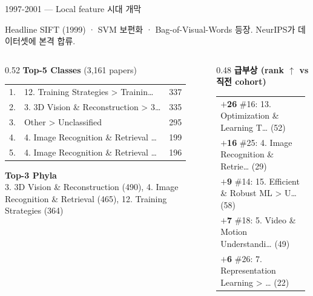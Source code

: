 \documentclass[aspectratio=169,t]{beamer}
\newcommand{\hot}[1]{\textcolor{accentorange}{\textbf{#1}}}
\newcommand{\muted}[1]{\textcolor{mutedgray}{#1}}
\begin{document}
\begin{frame}{1997-2001 \quad — \quad Local feature 시대 개막}
\small
\begin{block}{Headline}
SIFT (1999) · SVM 보편화 · Bag-of-Visual-Words 등장. NeurIPS가 데이터셋에 본격 합류.
\end{block}
\vspace{4pt}

\begin{columns}[T,onlytextwidth]
\begin{column}{0.52\textwidth}
\textbf{Top-5 Classes} \muted{\scriptsize (3,161 papers)}\\[2pt]
\scriptsize
\begin{tabular}{@{}rlr@{}}
    1. & 12. Training Strategies > Trainin… & 337 \\
    2. & 3. 3D Vision \& Reconstruction > 3… & 335 \\
    3. & Other > Unclassified & 295 \\
    4. & 4. Image Recognition \& Retrieval … & 199 \\
    5. & 4. Image Recognition \& Retrieval … & 196 \\
\end{tabular}
\vspace{8pt}

\textbf{\small Top-3 Phyla}\\[2pt]
\scriptsize 3. 3D Vision \& Reconstruction (490), 4. Image Recognition \& Retrieval (465), 12. Training Strategies (364)
\end{column}

\begin{column}{0.48\textwidth}
\textbf{급부상 (rank $\uparrow$ vs 직전 cohort)}\\[2pt]
\scriptsize
\begin{tabular}{@{}p{0.95\linewidth}@{}}
    \hot{$+$26} \#16: 13. Optimization \& Learning T… (52) \\
    \hot{$+$16} \#25: 4. Image Recognition \& Retrie… (29) \\
    \hot{$+$9} \#14: 15. Efficient \& Robust ML > U… (58) \\
    \hot{$+$7} \#18: 5. Video \& Motion Understandi… (49) \\
    \hot{$+$6} \#26: 7. Representation Learning > … (22) \\
\end{tabular}
\end{column}
\end{columns}
\end{frame}
\end{document}
